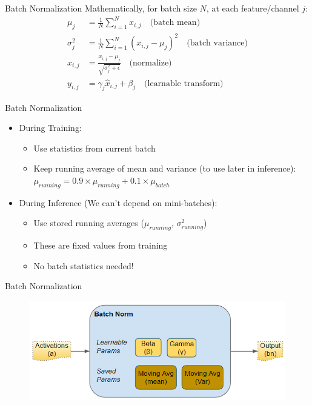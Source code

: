 \documentclass[10pt]{beamer}
\theoremstyle{remark}
\theoremstyle{definition}
\begin{document}
\begin{frame}{Batch Normalization}
    Mathematically, for batch size $N$, at each feature/channel $j$:
    \[
    \begin{aligned}
    \mu_j &= \frac{1}{N}\sum_{i=1}^N x_{i,j} \quad \text{(batch mean)} \\
    \sigma^2_j &= \frac{1}{N}\sum_{i=1}^N (x_{i,j} - \mu_j)^2 \quad \text{(batch variance)} \\
    \hat{x}_{i,j} &= \frac{x_{i,j} - \mu_j}{\sqrt{\sigma^2_j + \epsilon}} \quad \text{(normalize)} \\
    y_{i,j} &= \gamma_j\hat{x}_{i,j} + \beta_j \quad \text{(learnable transform)}
    \end{aligned}
    \]
\end{frame}

\begin{frame}{Batch Normalization}
    \begin{itemize}
        \item During Training:
        \begin{itemize}
            \item Use statistics from current batch
            \item Keep running average of mean and variance (to use later in inference): \\
            $\mu_{running} = 0.9 \times \mu_{running} + 0.1 \times \mu_{batch}$
        \end{itemize}
        \vspace{0.5em}
        \item During Inference (We can't depend on mini-batches):
        \begin{itemize}
            \item Use stored running averages ($\mu_{running}$, $\sigma^2_{running}$)
            \item These are fixed values from training
            \item No batch statistics needed!
        \end{itemize}
    \end{itemize}
\end{frame}

\begin{frame}{Batch Normalization}
    \begin{figure}
    \centering
    \includegraphics[width=1.0\textwidth,height=1.0\textheight,keepaspectratio]{./images/BatchNorm1.png}
    \end{figure}
\end{frame}
\end{document}
